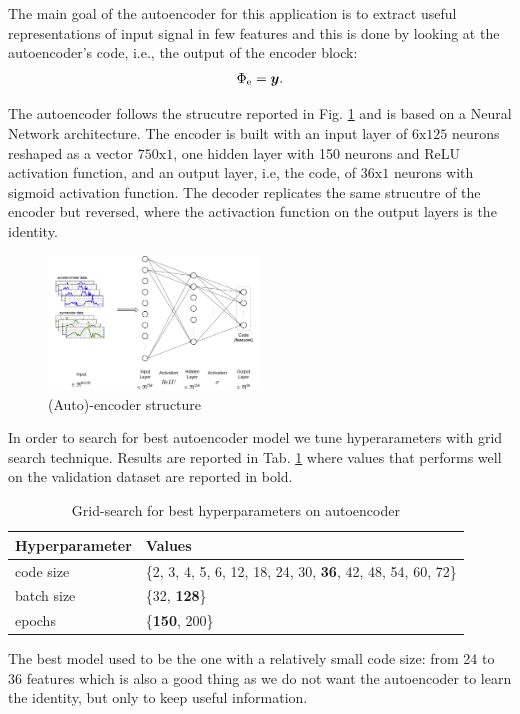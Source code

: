 The main goal of the autoencoder for this application is to extract
useful representations of input signal in few features and this is
done by looking at the autoencoder's code, i.e., the output of the
encoder block:
\begin{equation}
  \Phi_{\text{e}} = \boldsymbol{y}.
\end{equation}

The autoencoder follows the strucutre reported in
Fig. \ref{fig:encoder-structure} and is based on a Neural Network
architecture. The encoder is built with an input layer of
$6\text{x}125$ neurons reshaped as a vector $750\text{x}1$, one hidden
layer with 150 neurons and ReLU activation function, and an output
layer, i.e, the code, of $36\text{x}1$ neurons with sigmoid activation
function. The decoder replicates the same strucutre of the encoder but
reversed, where the activaction function on the output layers is the
identity.
\begin{figure}[h]
  \includegraphics[width=0.5\textwidth]{images/encoder.jpg}
  \caption{(Auto)-encoder structure}
  \label{fig:encoder-structure}
\end{figure}

In order to search for best autoencoder model we tune hyperarameters
with grid search technique. Results are reported in
Tab. \ref{tab:ae-hyperparams} where values that performs well on the
validation dataset are reported in bold.
\begin{table}
  \centering
  \begin{tabular}{lp{4cm}}
    \hline
    Hyperparameter & Values \\
    \hline
    code size & \{2, 3, 4, 5, 6, 12, 18, 24, 30, \textbf{36}, 42, 48, 54, 60, 72\} \\
    batch size & \{32, \textbf{128}\} \\
    epochs & \{\textbf{150}, 200\} \\
    \hline
  \end{tabular}
  \caption{Grid-search for best hyperparameters on autoencoder}
  \label{tab:ae-hyperparams}
\end{table}
The best model used to be the one with a relatively small code
size: from 24 to 36 features which is also a good thing as we do not
want the autoencoder to learn the identity, but only to keep useful
information.


